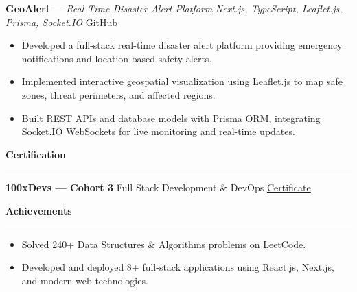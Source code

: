\documentclass[10pt,a4paper]{article}
\newcommand{\cvsection}[1]{%
  \vspace{5pt}%
  {\large\bfseries\color{primarycolor} #1}%
  \vspace{1.5pt}\hrule\vspace{3.5pt}%
}
\begin{document}
\vspace{4pt}

\textbf{GeoAlert} --- \textnormal{\textit{Real-Time Disaster Alert Platform}} \;\textbar\; \textit{Next.js, TypeScript, Leaflet.js, Prisma, Socket.IO} \hfill \href{https://github.com/Varad163/GeoAlert}{GitHub}
\begin{itemize}
    \item Developed a full-stack real-time disaster alert platform providing emergency notifications and location-based safety alerts.
    \item Implemented interactive geospatial visualization using Leaflet.js to map safe zones, threat perimeters, and affected regions.
    \item Built REST APIs and database models with Prisma ORM, integrating Socket.IO WebSockets for live monitoring and real-time updates.
\end{itemize}

\cvsection{Certification}

\textbf{100xDevs --- Cohort 3} \;\textbar\; Full Stack Development \& DevOps \hfill \href{https://generateinvoice.teachx.in/generatecertificate/certificate/harkirat_db/75222/40409/12}{Certificate}

\cvsection{Achievements}

\begin{itemize}[label=$\bullet$]
    \item Solved 240+ Data Structures \& Algorithms problems on LeetCode.
    \item Developed and deployed 8+ full-stack applications using React.js, Next.js, and modern web technologies.
\end{itemize}
\end{document}
